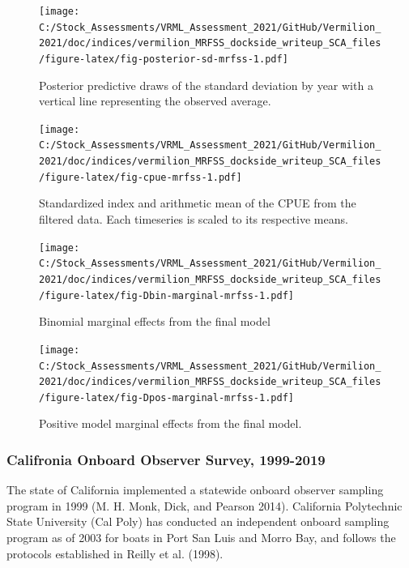 \documentclass[
  english,
  a4paper,
]{article}
\begin{document}
\begin{figure}
\centering
\texttt{[image: C:/Stock\_Assessments/VRML\_Assessment\_2021/GitHub/Vermilion\_2021/doc/indices/vermilion\_MRFSS\_dockside\_writeup\_SCA\_files/figure-latex/fig-posterior-sd-mrfss-1.pdf]}
\caption{\label{fig:fig-posterior-sd-mrfss}Posterior predictive draws of the standard deviation by year with a vertical line representing the observed average.}
\end{figure}

\begin{figure}
\centering
\texttt{[image: C:/Stock\_Assessments/VRML\_Assessment\_2021/GitHub/Vermilion\_2021/doc/indices/vermilion\_MRFSS\_dockside\_writeup\_SCA\_files/figure-latex/fig-cpue-mrfss-1.pdf]}
\caption{\label{fig:fig-cpue-mrfss}Standardized index and arithmetic mean of the CPUE from the filtered data. Each timeseries is scaled to its respective means.}
\end{figure}

\begin{figure}
\centering
\texttt{[image: C:/Stock\_Assessments/VRML\_Assessment\_2021/GitHub/Vermilion\_2021/doc/indices/vermilion\_MRFSS\_dockside\_writeup\_SCA\_files/figure-latex/fig-Dbin-marginal-mrfss-1.pdf]}
\caption{\label{fig:fig-Dbin-marginal-mrfss}Binomial marginal effects from the final model}
\end{figure}

\begin{figure}
\centering
\texttt{[image: C:/Stock\_Assessments/VRML\_Assessment\_2021/GitHub/Vermilion\_2021/doc/indices/vermilion\_MRFSS\_dockside\_writeup\_SCA\_files/figure-latex/fig-Dpos-marginal-mrfss-1.pdf]}
\caption{\label{fig:fig-Dpos-marginal-mrfss}Positive model marginal effects from the final model.}
\end{figure}

\clearpage

\hypertarget{califronia-onboard-observer-survey-1999-2019}{%
\subsubsection{Califronia Onboard Observer Survey, 1999-2019}\label{califronia-onboard-observer-survey-1999-2019}}

The state of California implemented a statewide onboard observer sampling
program in 1999 (M. H. Monk, Dick, and Pearson 2014). California Polytechnic State University (Cal
Poly) has conducted an independent onboard sampling
program as of 2003 for boats in Port San Luis and Morro Bay, and follows
the protocols established in Reilly et al. (1998).
\end{document}
